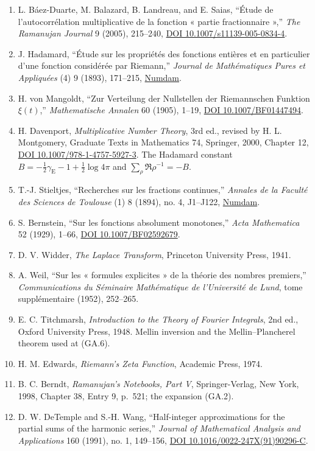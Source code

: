 \documentclass[
  11pt,
]{book}
\begin{document}
\begin{enumerate}
\item
  L. Báez-Duarte, M. Balazard, B. Landreau, and E. Saias, ``Étude de
  l'autocorrélation multiplicative de la fonction « partie fractionnaire
  »,'' \emph{The Ramanujan Journal} 9 (2005), 215--240,
  \href{https://doi.org/10.1007/s11139-005-0834-4}{DOI
  10.1007/s11139-005-0834-4}.
\item
  J. Hadamard, ``Étude sur les propriétés des fonctions entières et en
  particulier d'une fonction considérée par Riemann,'' \emph{Journal de
  Mathématiques Pures et Appliquées} (4) 9 (1893), 171--215,
  \href{http://www.numdam.org/item/JMPA_1893_4_9__171_0/}{Numdam}.
\item
  H. von Mangoldt, ``Zur Verteilung der Nullstellen der Riemannschen
  Funktion \(\xi(t)\),'' \emph{Mathematische Annalen} 60 (1905), 1--19,
  \href{https://doi.org/10.1007/BF01447494}{DOI 10.1007/BF01447494}.
\item
  H. Davenport, \emph{Multiplicative Number Theory}, 3rd ed., revised by
  H. L. Montgomery, Graduate Texts in Mathematics 74, Springer, 2000,
  Chapter 12, \href{https://doi.org/10.1007/978-1-4757-5927-3}{DOI
  10.1007/978-1-4757-5927-3}. The Hadamard constant
  \(B=-\tfrac12\gamma_{\mathrm E}-1+\tfrac12\log4\pi\) and
  \(\sum_\rho\Re\rho^{-1}=-B\).
\item
  T.-J. Stieltjes, ``Recherches sur les fractions continues,''
  \emph{Annales de la Faculté des Sciences de Toulouse} (1) 8 (1894),
  no. 4, J1--J122,
  \href{http://www.numdam.org/item/AFST_1894_1_8_4_J1_0/}{Numdam}.
\item
  S. Bernstein, ``Sur les fonctions absolument monotones,'' \emph{Acta
  Mathematica} 52 (1929), 1--66,
  \href{https://doi.org/10.1007/BF02592679}{DOI 10.1007/BF02592679}.
\item
  D. V. Widder, \emph{The Laplace Transform}, Princeton University
  Press, 1941.
\item
  A. Weil, ``Sur les « formules explicites » de la théorie des nombres
  premiers,'' \emph{Communications du Séminaire Mathématique de
  l'Université de Lund}, tome supplémentaire (1952), 252--265.
\item
  E. C. Titchmarsh, \emph{Introduction to the Theory of Fourier
  Integrals}, 2nd ed., Oxford University Press, 1948. Mellin inversion
  and the Mellin--Plancherel theorem used at (GA.6).
\item
  H. M. Edwards, \emph{Riemann's Zeta Function}, Academic Press, 1974.
\item
  B. C. Berndt, \emph{Ramanujan's Notebooks, Part V}, Springer-Verlag,
  New York, 1998, Chapter 38, Entry 9, p.~521; the expansion (GA.2).
\item
  D. W. DeTemple and S.-H. Wang, ``Half-integer approximations for the
  partial sums of the harmonic series,'' \emph{Journal of Mathematical
  Analysis and Applications} 160 (1991), no. 1, 149--156,
  \href{https://doi.org/10.1016/0022-247X(91)90296-C}{DOI
  10.1016/0022-247X(91)90296-C}.
\end{enumerate}

\endgroup

\backmatter
\end{document}
